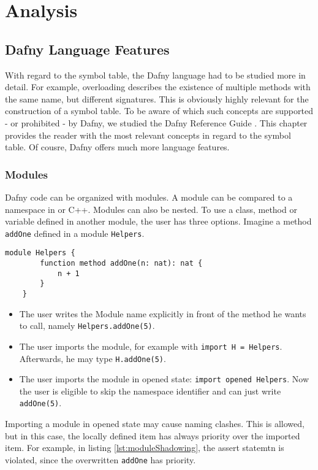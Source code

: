 \section{Analysis}
\subsection{Dafny Language Features}
With regard to the symbol table, the Dafny language had to be studied more in detail. For example, overloading describes the existence of multiple methods with the same name, but different signatures. This is obviously highly relevant for the construction of a symbol table.
To be aware of which such concepts are supported - or prohibited - by Dafny, we studied the Dafny Reference Guide \cite{dafnyReferenceManual}. This chapter provides the reader with the most relevant concepts in regard to the symbol table. Of cousre, Dafny offers much more language features.


\subsubsection{Modules}
Dafny code can be organized with modules. A module can be compared to a namespace in \Csharp or C++. Modules can also be nested. To use a class, method or variable defined in another module, the user has three options. Imagine a method \texttt{addOne} defined in a module \texttt{Helpers}.

\begin{lstlisting}[caption={Module Example}, captionpos=b, label={lst:shadowing}]
    module Helpers {
        function method addOne(n: nat): nat {
            n + 1
        }
    }
\end{lstlisting}

\begin{itemize}
    \item The user writes the Module name explicitly in front of the method he wants to call, \linebreak namely \texttt{Helpers.addOne(5)}.
    \item The user imports the module, for example with \texttt{import H = Helpers}. Afterwards, he may type \texttt{H.addOne(5)}.
    \item The user imports the module in opened state: \texttt{import opened Helpers}. Now the user is eligible to skip the namespace identifier and can just write \texttt{addOne(5)}.
\end{itemize}

Importing a module in opened state may cause naming clashes. This is allowed, but in this case, the locally defined item has always priority over the imported item. For example, in listing \ref{lst:moduleShadowing}, the assert statemtn is violated, since the overwritten \texttt{addOne} has priority. \cite{functionVSMethod} 

